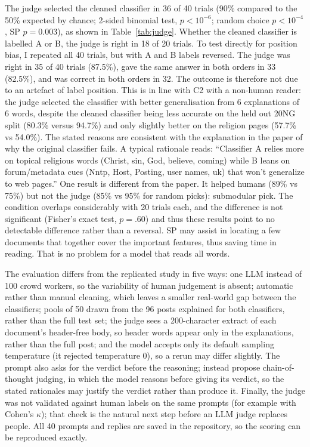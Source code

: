 \documentclass[11pt]{article}
\begin{document}
The judge selected the cleaned classifier in 36 of 40 trials (90\% compared to the 50\% expected by chance; 2-sided binomial test, $p < 10^{-6}$; random choice $p < 10^{-4}$, SP $p = 0.003$), as shown in Table~\ref{tab:judge}. Whether the cleaned classifier is labelled A or B, the judge is right in 18 of 20 trials. To test directly for position bias, I repeated all 40 trials, but with A and B labels reversed. The judge was right in 35 of 40 trials (87.5\%), gave the same answer in both orders in 33 (82.5\%), and was correct in both orders in 32. The outcome is therefore not due to an artefact of label position. This is in line with C2 with a non-human reader: the judge selected the classifier with better generalisation from 6 explanations of 6 words, despite the cleaned classifier being less accurate on the held out 20NG split (80.3\% versus 94.7\%) and only slightly better on the religion pages (57.7\% vs 54.0\%). The stated reasons are consistent with the explanation in the paper of why the original classifier fails. A typical rationale reads: ``Classifier A relies more on topical religious words (Christ, sin, God, believe, coming) while B leans on forum/metadata cues (Nntp, Host, Posting, user names, uk) that won't generalize to web pages.'' One result is different from the paper. It helped humans (89\% vs 75\%) but not the judge (85\% vs 95\% for random picks): submodular pick. The condition overlaps considerably with 20 trials each, and the difference is not significant (Fisher's exact test, $p = .60$) and thus these results point to no detectable difference rather than a reversal. SP may assist in locating a few documents that together cover the important features, thus saving time in reading. That is no problem for a model that reads all words.

The evaluation differs from the replicated study in five ways: one LLM instead of 100 crowd workers, so the variability of human judgement is absent; automatic rather than manual cleaning, which leaves a smaller real-world gap between the classifiers; pools of 50 drawn from the 96 posts explained for both classifiers, rather than the full test set; the judge sees a 200-character extract of each document's header-free body, so header words appear only in the explanations, rather than the full post; and the model accepts only its default sampling temperature (it rejected temperature 0), so a rerun may differ slightly. The prompt also asks for the verdict before the reasoning; \citet{zheng2023judging} instead propose chain-of-thought judging, in which the model reasons before giving its verdict, so the stated rationales may justify the verdict rather than produce it. Finally, the judge was not validated against human labels on the same prompts (for example with Cohen's $\kappa$); that check is the natural next step before an LLM judge replaces people. All 40 prompts and replies are saved in the repository, so the scoring can be reproduced exactly.
\end{document}

